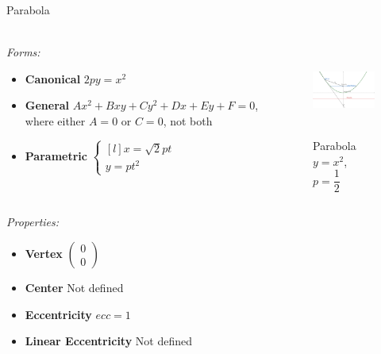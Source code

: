 \documentclass[aspectratio=169]{beamer}
\begin{document}
\begin{frame}[t]{Parabola}
\framesubtitle{}
    \scriptsize
    \vspace{-0.4cm}
\begin{columns}[T,onlytextwidth]
    \begin{column}{0.59\textwidth}
        \textit{Forms:} \\
\begin{itemize}
    \item \textbf{Canonical} $2py=x^2$
    \item \textbf{General} $Ax^2+Bxy+Cy^2+Dx+Ey+F=0$, where either $A=0$ or $C=0$, not both
    \item \textbf{Parametric} $\left\{\begin{matrix*}[l] x = \sqrt{2}pt\\ y = pt^2\end{matrix*}\right.$
\end{itemize}
    \end{column}
    \begin{column}{0.39\textwidth}
        \begin{figure}[H]
            \centering\includegraphics[height=3cm,width=1\textwidth,keepaspectratio]{Parabola.png}
            \vspace{-0.5cm}
            \caption*{\scriptsize Parabola $y=x^2$, $p=\dfrac{1}{2}$}
            \label{fig:Parabola.png}
        \end{figure}
    \end{column}
\end{columns}
\vspace{-0.6cm}
\textit{Properties:}
\begin{multicols}{3}
    \begin{itemize}
        \item \textbf{Vertex} $\begin{pmatrix} 0\\0 \end{pmatrix}$
        \item \textbf{Center} Not defined
        \item \textbf{Eccentricity} $ecc = 1$
        \item \textbf{Linear Eccentricity} Not defined

\end{itemize}
\end{multicols}
\end{frame}
\end{document}
